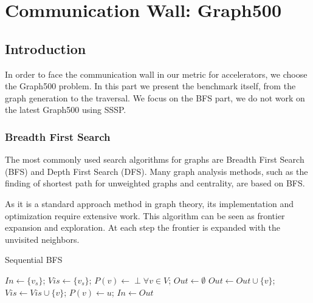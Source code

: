 
\chapter{Communication Wall: Graph500} 

\section{Introduction}
In order to face the communication wall in our metric for accelerators, we choose the Graph500 problem. 
In this part we present the benchmark itself, from the graph generation to the traversal. 
We focus on the BFS part, we do not work on the latest Graph500 using SSSP. 

\subsection{Breadth First Search}
The most commonly used search algorithms for graphs are Breadth First Search (BFS) and Depth First Search (DFS).
Many graph analysis methods, such as the finding of shortest path for unweighted graphs and centrality, are based on BFS. 

As it is a standard approach method in graph theory, its implementation and optimization require extensive work. 
This algorithm can be seen as frontier expansion and exploration. 
At each step the frontier is expanded with the unvisited neighbors.  

\begin{algorithm}
\caption{Sequential BFS}\label{alg:bfs_squential}
\begin{algorithmic}[1]
\State $In \gets \{v_s\}$;
\State $Vis \gets \{v_s\}$;
\State $P(v) \gets \perp \forall v \in V$;
	\State $Out \gets \emptyset$
				\State $Out \leftarrow Out \cup \{v\}$;
				\State $Vis \gets Vis \cup \{v\}$;
				\State $P(v) \leftarrow u$;
			\EndIf
		\EndFor
	\EndFor
	\State $In \gets Out$
\EndWhile
\EndFunction
\end{algorithmic}
\end{algorithm}

